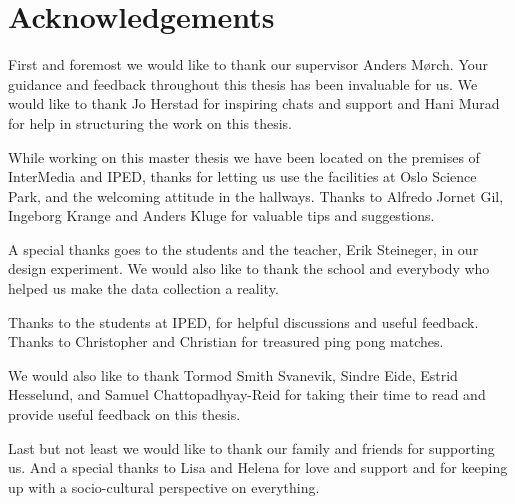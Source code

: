 \section*{Acknowledgements}
First and foremost we would like to thank our supervisor Anders Mørch. Your guidance and feedback throughout this thesis has been invaluable for us. We would like to thank Jo Herstad for inspiring chats and support and Hani Murad for help in structuring the work on this thesis. 

While working on this master thesis we have been located on the premises of InterMedia and IPED, thanks for letting us use the facilities at Oslo Science Park, and the welcoming attitude in the hallways. Thanks to Alfredo Jornet Gil, Ingeborg Krange and Anders Kluge for valuable tips and suggestions.

A special thanks goes to the students and the teacher, Erik Steineger, in our design experiment. We would also like to thank the school and everybody who helped us make the data collection a reality.

Thanks to the students at IPED, for helpful discussions and useful feedback. Thanks to Christopher and Christian for treasured ping pong matches.

We would also like to thank Tormod Smith Svanevik, Sindre Eide, Estrid Hesselund, and Samuel Chattopadhyay-Reid for taking their time to read and provide useful feedback on this thesis.

Last but not least we would like to thank our family and friends for supporting us. And a special thanks to Lisa and Helena for love and support and for keeping up with a socio-cultural perspective on everything.



\newpage
